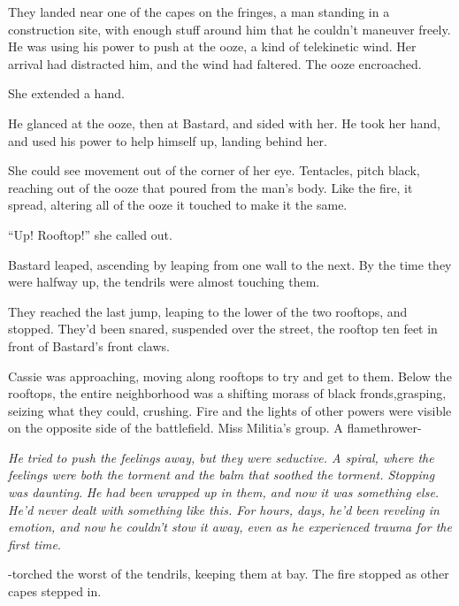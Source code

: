 They landed near one of the capes on the fringes, a man standing in a construction site, with enough stuff around him that he couldn't maneuver freely.   He was using his power to push at the ooze, a kind of telekinetic wind.  Her arrival had distracted him, and the wind had faltered.  The ooze encroached.



She extended a hand.



He glanced at the ooze, then at Bastard, and sided with her.  He took her hand, and used his power to help himself up, landing behind her.



She could see movement out of the corner of her eye.  Tentacles, pitch black, reaching out of the ooze that poured from the man's body.  Like the fire, it spread, altering all of the ooze it touched to make it the same.



``Up!  Rooftop!'' she called out.



Bastard leaped, ascending by leaping from one wall to the next.  By the time they were halfway up, the tendrils were almost touching them.



They reached the last jump, leaping to the lower of the two rooftops, and stopped.  They'd been snared, suspended over the street, the rooftop ten feet in front of Bastard's front claws.



Cassie was approaching, moving along rooftops to try and get to them.  Below the rooftops, the entire neighborhood was a shifting morass of black fronds,grasping, seizing what they could, crushing.  Fire and the lights of other powers were visible on the opposite side of the battlefield.  Miss Militia's group.  A flamethrower-



\emph{He tried to push the feelings away, but they were seductive.  A spiral, where the feelings were both the torment and the balm that soothed the torment.  Stopping was daunting}.  \emph{He had been wrapped up in them, and now it was something else.  He'd never dealt with something like this.  For hours, days, he'd been reveling in emotion, and now he couldn't stow it away, even as he experienced trauma for the first time}.



-torched the worst of the tendrils, keeping them at bay.  The fire stopped as other capes stepped in.



